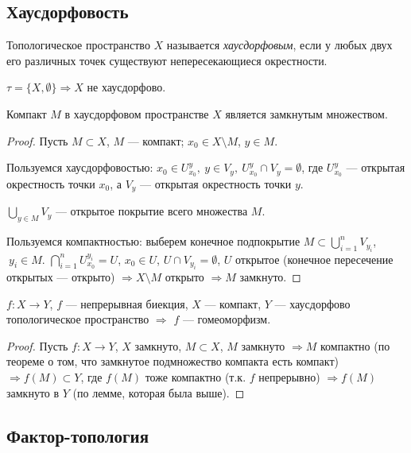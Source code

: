 \subsection{Хаусдорфовость}
\begin{definition}
    Топологическое пространство $X$ называется \textit{хаусдорфовым}, если у любых двух его различных точек существуют непересекающиеся окрестности.
\end{definition}

$\tau = \{X, \emptyset\} \Longrightarrow X$ не хаусдорфово.

\begin{lemma}
    Компакт $M$ в хаусдорфовом пространстве $X$ является замкнутым множеством.
\end{lemma}
\begin{proof}
    Пусть $M \subset X$, $M$ — компакт;
    $x_0 \in X \setminus M$, $y \in M$.

    Пользуемся хаусдорфовостью: $x_0 \in U_{x_0}^y, \ y \in V_y, \ U_{x_0}^y \cap V_y = \emptyset$, где $U_{x_0}^y$ — открытая окрестность точки $x_0$, а $V_y$ — открытая окрестность точки $y$.

    $\bigcup_{y \in M} V_y$ — открытое покрытие всего множества $M$.

    Пользуемся компактностью: выберем конечное подпокрытие $M \subset \bigcup_{i = 1}^n V_{y_i}$, $\ y_i \in M$.
    $\bigcap_{i = 1}^n U_{x_0}^{y_i} = U$, $x_0 \in U$, $U \cap V_{y_i} = \emptyset$, $U$ открытое (конечное пересечение открытых — открыто) $\Longrightarrow X \setminus M$ открыто $\Longrightarrow M$ замкнуто.
\end{proof}

\begin{statement}
    $f: X \to Y$, $f$ — непрерывная биекция, $X$ — компакт, $Y$ — хаусдорфово топологическое пространство $\Longrightarrow$ $f$ — гомеоморфизм.
\end{statement}
\begin{proof}
    Пусть $f: X \to Y$, $X$ замкнуто, $M \subset X$, $M$ замкнуто $\Longrightarrow M$ компактно (по теореме о том, что замкнутое подмножество компакта есть компакт) $\Longrightarrow f(M) \subset Y$, где $f(M)$ тоже компактно (т.к. $f$ непрерывно) $\Longrightarrow f(M)$ замкнуто в $Y$ (по лемме, которая была выше). 
\end{proof}


\subsection{Фактор-топология}

